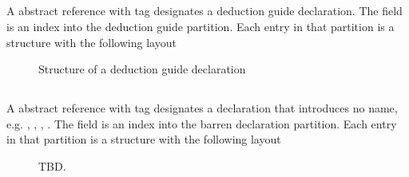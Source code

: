 

\subsection{}
\label{sec:ifc:DeclSort:DeductionGuide}

A  abstract reference with tag  designates
a deduction guide declaration.  The  field is an index into the 
deduction guide partition.  Each entry in that partition is a structure with the 
following layout
%
\begin{figure}[H]
	\centering
	\caption{Structure of a deduction guide declaration}
	\label{fig:ifc-deduction-guide-decl-structure}
\end{figure}



\subsection{}
\label{sec:ifc:DeclSort:Barren}

A  abstract reference with tag  designates
a declaration that introduces no name, e.g. , , , .
The  field is an index into the barren declaration partition.  Each entry
in that partition is a structure with the following layout
%
\begin{figure}[H]
	\centering
	TBD.
\end{figure}
%



\subsection{}
\label{sec:ifc:DeclSort:Tuple}

